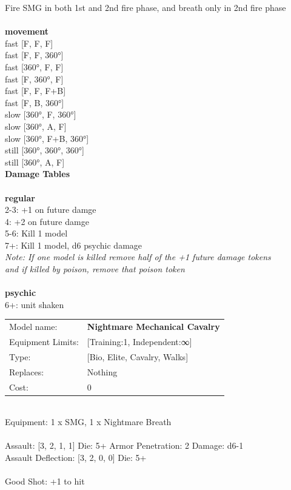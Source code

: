 {\noindent Fire SMG in both 1st and 2nd fire phase, and breath only in 2nd fire phase\\ 


\ \\ {\bf movement } \\
fast [F, F, F] \\
fast [F, F, 360°] \\
fast [360°, F, F] \\
fast [F, 360°, F] \\
fast [F, F, F+B] \\
fast [F, B, 360°] \\
slow [360°, F, 360°] \\
slow [360°, A, F] \\
slow [360°, F+B, 360°] \\
still [360°, 360°, 360°] \\
still [360°, A, F] \\


{\bf Damage Tables} \\
\ \\ {\bf regular } \\
2-3: +1 on future damge \\
4: +2 on future damge \\
5-6: Kill 1 model \\
7+: Kill 1 model, d6 psychic damage \\
{{\it Note: If one model is killed remove half of the +1 future damage tokens \\ and if killed by poison, remove that poison token}} \\
\ \\ {\bf psychic } \\
6+: unit shaken \\


\noindent
\begin{tabular}{ll}
Model name: &{\bf Nightmare Mechanical Cavalry } \\
Equipment Limits: &[Training:1, Independent:∞] \\
Type: &[Bio, Elite, Cavalry, Walks] \\
Replaces: &Nothing \\
Cost: & 0\\
\end{tabular}
\ \\
Equipment: 1 x SMG, 1 x Nightmare Breath \\
\ \\
Assault: [3, 2, 1, 1] Die: 5+ Armor Penetration: 2 Damage: d6-1 \\
Assault Deflection: [3, 2, 0, 0] Die: 5+\\
\indent  
\ \\
Good Shot: +1 to hit\\ 

}
